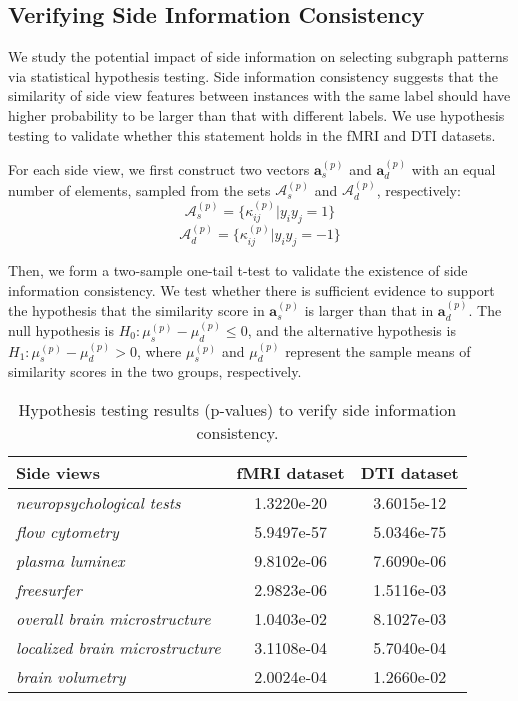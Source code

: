 \documentclass[conference]{IEEEtran}
\newcommand{\neu}[0]{\emph{neuropsychological tests}}
\newcommand{\flo}[0]{\emph{flow cytometry}}
\newcommand{\pla}[0]{\emph{plasma luminex}}
\newcommand{\fre}[0]{\emph{freesurfer}}
\newcommand{\ave}[0]{\emph{overall brain microstructure}}
\newcommand{\dti}[0]{\emph{localized brain microstructure}}
\newcommand{\seg}[0]{\emph{brain volumetry}}
\begin{document}
\subsection{Verifying Side Information Consistency}\label{sec:ttest}

We study the potential impact of side information on selecting subgraph patterns via statistical hypothesis testing. Side information consistency suggests that the similarity of side view features between instances with the same label should have higher probability to be larger than that with different labels. We use hypothesis testing to validate whether this statement holds in the fMRI and DTI datasets.

For each side view, we first construct two vectors $\mathbf{a}_s^{(p)}$ and $\mathbf{a}_d^{(p)}$ with an equal number of elements, sampled from the sets $\mathcal{A}_s^{(p)}$ and $\mathcal{A}_d^{(p)}$, respectively:
\begin{equation}
\mathcal{A}_s^{(p)}=\{\kappa^{(p)}_{ij}|y_iy_j=1\}
\label{eq:a_s}
\end{equation}\vspace{-15pt}\begin{equation}
\mathcal{A}_d^{(p)}=\{\kappa^{(p)}_{ij}|y_iy_j=-1\}
\label{eq:a_d}
\end{equation}

Then, we form a two-sample one-tail t-test to validate the existence of side information consistency. We test whether there is sufficient evidence to support the hypothesis that the similarity score in $\mathbf{a}_s^{(p)}$ is larger than that in $\mathbf{a}_d^{(p)}$. The null hypothesis is $H_0: \mu_s^{(p)}-\mu_d^{(p)}\leq0$, and the alternative hypothesis is $H_1: \mu_s^{(p)}-\mu_d^{(p)}>0$, where $\mu_s^{(p)}$ and $\mu_d^{(p)}$ represent the sample means of similarity scores in the two groups, respectively.

\begin{table}[!ht]
\caption{Hypothesis testing results (p-values) to verify side information consistency.}
\small
\label{tab:result_ttest}
\centering
\begin{tabular}{lcc}
\toprule%
Side views	&fMRI dataset &DTI dataset\\
\midrule %
{\neu}	&1.3220e-20	&3.6015e-12 \\
{\flo}  	&5.9497e-57	&5.0346e-75 \\
{\pla}  	&9.8102e-06	&7.6090e-06 \\
{\fre}  	&2.9823e-06	&1.5116e-03 \\
{\ave}	&1.0403e-02	&8.1027e-03 \\
{\dti}	&3.1108e-04	&5.7040e-04 \\
{\seg}	&2.0024e-04	&1.2660e-02 \\
\bottomrule%
\end{tabular}
\end{table}
\end{document}
